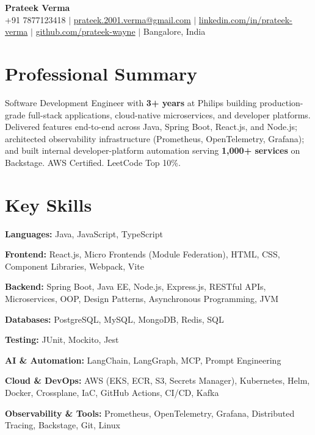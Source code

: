 \documentclass[letterpaper,10.5pt]{article}
\begin{document}
\begin{center}
  {\LARGE \textbf{Prateek Verma}} \\[2pt]
  +91 7877123418 \;$|$\;
  \href{mailto:prateek.2001.verma@gmail.com}{prateek.2001.verma@gmail.com} \;$|$\;
  \href{https://linkedin.com/in/prateek-verma}{linkedin.com/in/prateek-verma} \;$|$\;
  \href{https://github.com/Prateek-Wayne}{github.com/prateek-wayne} \;$|$\;
  Bangalore, India
\end{center}

\section{Professional Summary}
\small{
Software Development Engineer with \textbf{3+ years} at Philips building production-grade full-stack applications, cloud-native microservices, and developer platforms. Delivered features end-to-end across Java, Spring Boot, React.js, and Node.js; architected observability infrastructure (Prometheus, OpenTelemetry, Grafana); and built internal developer-platform automation serving \textbf{1,000+ services} on Backstage. AWS Certified. LeetCode Top 10\%.
}

\section{Key Skills}
\begin{itemize}[leftmargin=0.15in, label={}, itemsep=-1pt]
  \small{
    \item \textbf{Languages:} Java, JavaScript, TypeScript
    \item \textbf{Frontend:} React.js, Micro Frontends (Module Federation), HTML, CSS, Component Libraries, Webpack, Vite
    \item \textbf{Backend:} Spring Boot, Java EE, Node.js, Express.js, RESTful APIs, Microservices, OOP, Design Patterns, Asynchronous Programming, JVM
    \item \textbf{Databases:} PostgreSQL, MySQL, MongoDB, Redis, SQL
    \item \textbf{Testing:} JUnit, Mockito, Jest
    \item \textbf{AI \& Automation:} LangChain, LangGraph, MCP, Prompt Engineering
    \item \textbf{Cloud \& DevOps:} AWS (EKS, ECR, S3, Secrets Manager), Kubernetes, Helm, Docker, Crossplane, IaC, GitHub Actions, CI/CD, Kafka
    \item \textbf{Observability \& Tools:} Prometheus, OpenTelemetry, Grafana, Distributed Tracing, Backstage, Git, Linux
  }
\end{itemize}
\end{document}
